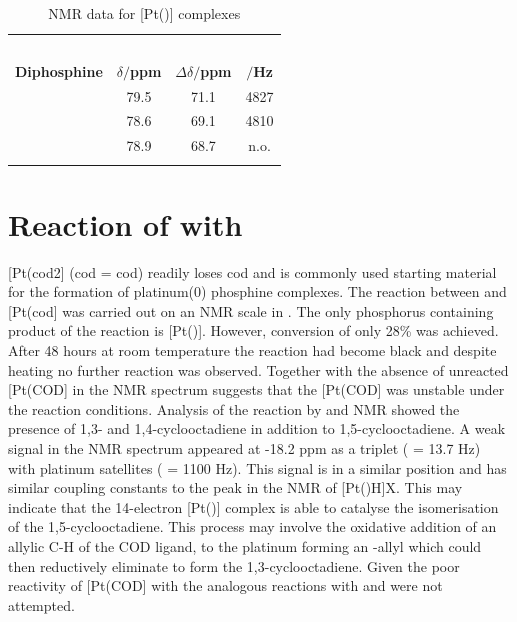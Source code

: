 \begin{table}[htbp]
\caption[\phosphorus{} NMR data for [Pt(\tBuxantphos){]} complexes]{\phosphorus{} NMR data for [Pt(\tBuxantphos){]} complexes}
\vspace{1em}
\label{table:Pt14NMR}
\small
\begin{center}
\begin{tabular}{l c c c}
\toprule{}
	~~ & \multicolumn{3}{c}{\bfseries{\phosphorus}} \\
	\cmidrule(lr){2-4}
	\bfseries{Diphosphine}&\bfseries{$\delta/$ppm}&\bfseries{$\Delta\delta/$ppm}&\bfseries{\JPtP{}$/$Hz}\\
	\midrule{}
	\tBuSixantphos 		& 79.5 & 71.1 & 4827 \\
	\tBuThixantphos 	& 78.6 & 69.1 & 4810 \\
	\tBuXantphos		& 78.9 & 68.7 & n.o.\\
	\bottomrule{}
\end{tabular}
\end{center}
\end{table}

\section{Reaction of \tButhixantphos{} with \texorpdfstring{\ce{[Pt(COD)2]}} P}

[Pt(\acrshort{cod}\ce{)}2] (\acrshort{cod} = \acrlong{cod}) readily loses \gls{cod} and is commonly used starting material for the formation of platinum(0) phosphine complexes.\cite{Green1975b, Green1977c}  The reaction between \tButhixantphos{} and [Pt(cod] was carried out on an NMR scale in .  The only phosphorus containing product of the reaction is [Pt(\tButhixantphos)].  However, conversion of only 28\% was achieved.  After 48 hours at room temperature the reaction had become black and despite heating no further reaction was observed.  Together with the absence of unreacted [Pt(COD] in the \proton{} NMR spectrum suggests that the [Pt(COD] was unstable under the reaction conditions.  Analysis of the reaction by \proton{} and \carbon{} NMR showed the presence of 1,3- and 1,4-cyclooctadiene in addition to 1,5-cyclooctadiene.  A weak signal in the \proton{} NMR spectrum appeared at -18.2 ppm as a triplet (\JPH{} = 13.7 Hz) with platinum satellites (\JPtH{} = 1100 Hz).  This signal is in a similar position and has similar coupling constants to the peak in the \proton{} NMR of [Pt(\tBuxantphos)H]X.  This may indicate that the 14-electron [Pt(\tButhixantphos)] complex is able to catalyse the isomerisation of the 1,5-cyclooctadiene.  This process may involve the oxidative addition of an allylic C-H of the COD ligand, to the platinum forming an -allyl which could then reductively eliminate to form the 1,3-cyclooctadiene.    Given the poor reactivity of [Pt(COD] with \tButhixantphos{} the analogous reactions with \tBusixantphos{} and \tBuxantphos{} were not attempted.  

